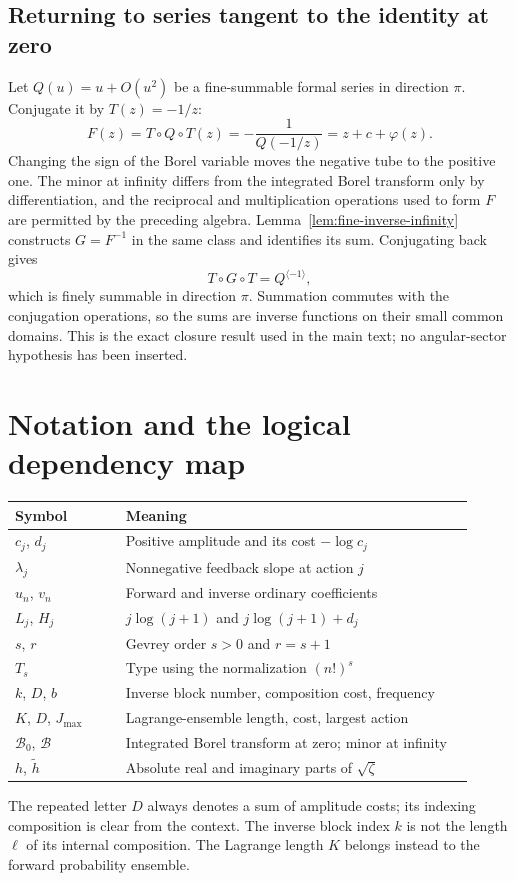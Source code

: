 \documentclass[11pt,a4paper]{article}
\numberwithin{equation}{section}
\theoremstyle{definition}
\theoremstyle{remark}
\theoremstyle{definition}
\newcommand{\B}{\mathcal B_0}
\newcommand{\inv}{\langle-1\rangle}
\begin{document}
\subsection{Returning to series tangent to the identity at zero}
Let $Q(u)=u+O(u^2)$ be a fine-summable formal series in direction $\pi$.
Conjugate it by $T(z)=-1/z$:
\[
 F(z)=T\circ Q\circ T(z)=-\frac1{Q(-1/z)}=z+c+\varphi(z).
\]
Changing the sign of the Borel variable moves the negative tube to the
positive one. The minor at infinity differs from the integrated Borel
transform only by differentiation, and the reciprocal and multiplication
operations used to form $F$ are permitted by the preceding algebra.
Lemma~\ref{lem:fine-inverse-infinity} constructs $G=F^{-1}$ in the same
class and identifies its sum. Conjugating back gives
\[
 T\circ G\circ T=Q^{\inv},
\]
which is finely summable in direction $\pi$. Summation commutes with the
conjugation operations, so the sums are inverse functions on their
small common domains. This is the exact closure result used in the
main text; no angular-sector hypothesis has been inserted.

\section{Notation and the logical dependency map}
\label{app:notation}

\begin{center}
\begin{tabular}{@{}p{0.22\linewidth}p{0.69\linewidth}@{}}
\toprule
Symbol & Meaning\\
\midrule
$c_j$, $d_j$ & Positive amplitude and its cost $-\log c_j$\\
$\lambda_j$ & Nonnegative feedback slope at action $j$\\
$u_n$, $v_n$ & Forward and inverse ordinary coefficients\\
$L_j$, $H_j$ & $j\log(j+1)$ and $j\log(j+1)+d_j$\\
$s$, $r$ & Gevrey order $s>0$ and $r=s+1$\\
$T_s$ & Type using the normalization $(n!)^s$\\
$k$, $D$, $b$ & Inverse block number, composition cost, frequency\\
$K$, $D$, $J_{\max}$ & Lagrange-ensemble length, cost, largest action\\
$\B$, $\mathscr B$ & Integrated Borel transform at zero; minor at infinity\\
$h$, $\widetilde h$ & Absolute real and imaginary parts of $\sqrt\zeta$\\
\bottomrule
\end{tabular}
\end{center}
The repeated letter $D$ always denotes a sum of amplitude costs; its
indexing composition is clear from the context. The inverse block index
$k$ is not the length $\ell$ of its internal composition. The Lagrange
length $K$ belongs instead to the forward probability ensemble.
\end{document}
